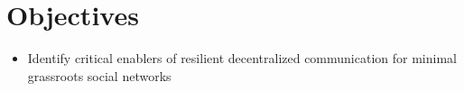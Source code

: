 \section{Objectives}

\begin{frame}
    \begin{itemize}
        \item Identify critical enablers of resilient decentralized communication for minimal grassroots social networks
    \end{itemize}
\end{frame}